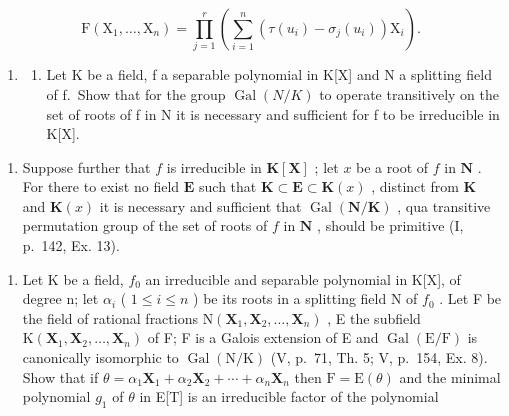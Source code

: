 \[
\mathrm{F} \left(\mathrm{X} _ {1}, \dots , \mathrm{X} _ {n}\right) = \prod_ {j = 1} ^ {r} \left(\sum_ {i = 1} ^ {n} \left(\tau \left(u _ {i}\right) - \sigma_ {j} \left(u _ {i}\right)\right) \mathrm{X} _ {i}\right).
\]

\BourbakiExerciseGroup

\begin{enumerate}
\def\labelenumi{\arabic{enumi})}
\tightlist
\item
  \begin{enumerate}
  \def\labelenumii{\alph{enumii})}
  \tightlist
  \item
    Let K be a field, f a separable polynomial in K{[}X{]} and N a splitting field of f.~Show that for the group \(\operatorname{Gal}(N/K)\) to operate transitively on the set of roots of f in N it is necessary and sufficient for f to be irreducible in K{[}X{]}.
  \end{enumerate}
\end{enumerate}

\begin{enumerate}
\def\labelenumi{\alph{enumi})}
\setcounter{enumi}{1}
\tightlist
\item
  Suppose further that \(f\) is irreducible in \(\mathbf{K}[\mathbf{X}]\) ; let \(x\) be a root of \(f\) in \(\mathbf{N}\) . For there to exist no field \(\mathbf{E}\) such that \(\mathbf{K} \subset \mathbf{E} \subset \mathbf{K}(x)\) , distinct from \(\mathbf{K}\) and \(\mathbf{K}(x)\) it is necessary and sufficient that \(\operatorname{Gal}(\mathbf{N} / \mathbf{K})\) , qua transitive permutation group of the set of roots of \(f\) in \(\mathbf{N}\) , should be primitive (I, p.~142, Ex. 13).
\end{enumerate}

\begin{enumerate}
\def\labelenumi{\arabic{enumi})}
\setcounter{enumi}{1}
\tightlist
\item
  Let K be a field, \(f_{0}\) an irreducible and separable polynomial in K{[}X{]}, of degree n; let \(\alpha_{i}\) ( \(1 \leqslant i \leqslant n\) ) be its roots in a splitting field N of \(f_{0}\) . Let F be the field of rational fractions \(\mathrm{N}(\mathbf{X}_{1}, \mathbf{X}_{2}, \ldots, \mathbf{X}_{n})\) , E the subfield \(\mathrm{K}(\mathbf{X}_{1}, \mathbf{X}_{2}, \ldots, \mathbf{X}_{n})\) of F; F is a Galois extension of E and \(\operatorname{Gal}(\mathrm{E}/\mathrm{F})\) is canonically isomorphic to \(\operatorname{Gal}(\mathrm{N}/\mathrm{K})\) (V, p.~71, Th. 5; V, p.~154, Ex. 8). Show that if \(\theta = \alpha_{1}\mathbf{X}_{1} + \alpha_{2}\mathbf{X}_{2} + \cdots + \alpha_{n}\mathbf{X}_{n}\) then \(\mathrm{F} = \mathrm{E}(\theta)\) and the minimal polynomial \(g_{1}\) of \(\theta\) in E{[}T{]} is an irreducible factor of the polynomial
\end{enumerate}

